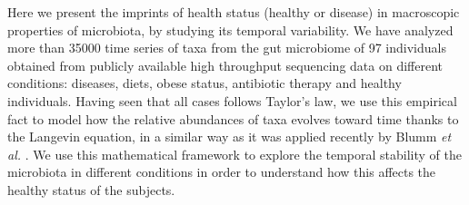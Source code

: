 Here we present the imprints of health status (healthy or disease) in macroscopic properties of microbiota, by studying its temporal variability. We have analyzed more than 35000 time series of taxa from the gut microbiome of 97 individuals obtained from publicly available high throughput sequencing data on different conditions: diseases, diets, obese status, antibiotic therapy and healthy individuals. Having seen that all cases follows Taylor's law, we use this empirical fact to model how the relative abundances of taxa evolves toward time thanks to the Langevin equation, in a similar way as it was applied recently by Blumm {\it et al.} \cite{ranking}. We use this mathematical framework to explore the temporal stability of the microbiota in different conditions in order to understand how this affects the healthy status of the subjects.